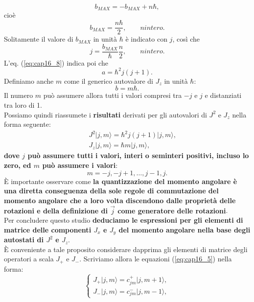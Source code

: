\begin{equation}
b_{MAX}=-b_{MAX}+n\hbar, 
\end{equation}
cioè
\begin{equation}
b_{MAX}=\frac{n\hbar}{2}, \qquad n intero.
\end{equation}
Solitamente il valore di $b_{MAX}$ in unità $\hbar$ è indicato con $j$, così che
\begin{equation}
j= \frac{b_{MAX}}{\hbar} \frac{n}{2}, \qquad n intero.
\end{equation}
L'eq. (\ref{eq:cap16_8}) indica poi che
\begin{equation}
a= \hbar ^2 j(j+1).
\end{equation}
Definiamo anche $m$ come il generico autovalore di $J_z$ in unità $\hbar$:
\begin{equation}
b=m\hbar .
\end{equation}
Il numero $m$ può assumere allora tutti i valori compresi tra $-j$ e $j$ e distanziati tra loro di 1.\\
Possiamo quindi riassumete i \textbf{risultati} derivati per gli autovalori di $J^2$ e $J_z$ nella forma seguente:
\begin{eqnarray}
& &J^2\vert j, m \rangle =\hbar ^2 j (j+1)\vert j, m \rangle , \\
& &J_z\vert j, m \rangle =\hbar  m\vert j, m \rangle ,
\end{eqnarray}
\textbf{dove $j$ può assumere tutti i valori, interi o seminteri positivi, incluso  lo zero, ed $m$ può assumere i valori}:
\begin{equation}
m=-j, -j+1,\dots , j-1, j.
\end{equation}
È importante osservare come \textbf{la quantizzazione del momento angolare è una diretta conseguenza della sole regole di commutazione del momento  angolare che a loro volta discendono dalle proprietà delle rotazioni e della definizione di $\vec{j}$ come generatore delle rotazioni}.\\
Per concludere questo studio \textbf{deduciamo le espressioni per gli elementi di matrice delle componenti $J_x$ e $J_y$ del momento angolare nella base degli autostati di $J^2$ e $J_z$}.\\
È conveniente a tale proposito considerare dapprima gli elementi di matrice degli operatori a scala $J_+$ e $J_-$. Scriviamo allora le equazioni (\ref{eq:cap16_5}) nella forma:
\begin{equation}
\begin{cases}
J_+\vert j, m \rangle = c_{jm} ^+\vert j, m+1 \rangle , \\
J_-\vert j, m \rangle = c_{jm} ^-\vert j, m-1 \rangle ,
\end{cases}
\end{equation}
